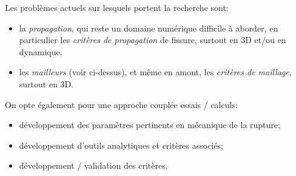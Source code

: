 \medskip
Les problèmes actuels sur lesquels portent la recherche sont:
\begin{itemize}
   \item la \emph{propagation}, qui reste un domaine numérique difficile à aborder, en
	particulier les \emph{critères de propagation} de fissure, surtout en 3D et/ou en dynamique.
   \item les \emph{mailleurs} (voir ci-dessus), et même en amont, les \emph{critères de maillage},
	surtout en 3D.	
\end{itemize}
\medskipvm
On opte également pour une approche couplée essais / calculs:
\begin{itemize}
   \item développement des paramètres pertinents en mécanique de la rupture;
   \item développement d'outils analytiques et critères associés;
   \item développement / validation des critères.
\end{itemize}

\medskip
